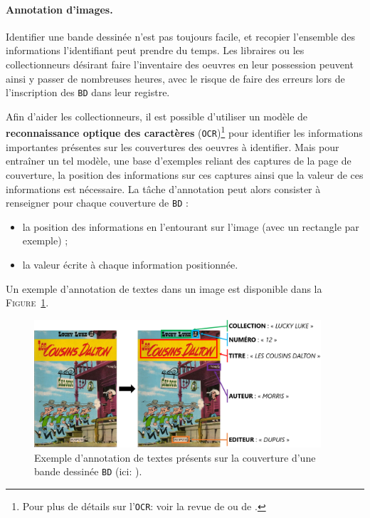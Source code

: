 			\paragraph{Annotation d'images.}
				
				Identifier une bande dessinée n'est pas toujours facile, et recopier l'ensemble des informations l'identifiant peut prendre du temps.
				Les libraires ou les collectionneurs désirant faire l'inventaire des oeuvres en leur possession peuvent ainsi y passer de nombreuses heures, avec le risque de faire des erreurs lors de l'inscription des \texttt{BD} dans leur registre.
				
				Afin d'aider les collectionneurs, il est possible d'utiliser un modèle de \textbf{reconnaissance optique des caractères} (\texttt{OCR})\footnote{Pour plus de détails sur l'\texttt{OCR}: voir la revue de \cite{berchmans-kumar:2014:optical-character-recognition} ou de \cite{awel-abidi:2019:review-optical-character}.} pour identifier les informations importantes présentes sur les couvertures des oeuvres à identifier.
				Mais pour entraîner un tel modèle, une base d'exemples reliant des captures de la page de couverture, la position des informations sur ces captures ainsi que la valeur de ces informations est nécessaire.
				La tâche d'annotation peut alors consister à renseigner pour chaque couverture de \texttt{BD} :
				\begin{itemize}
					\item la position des informations en l'entourant sur l'image (avec un rectangle par exemple) ;
					\item la valeur écrite à chaque information positionnée.
				\end{itemize}
				
				Un exemple d'annotation de textes dans un image est disponible dans la \textsc{Figure~\ref{figure:2.1.2-PRESENTATION-ANNOTATION-EXEMPLES-IMAGE-OCR}}.
				\begin{leftBarExamples}
					\begin{figure}[H]
						\centering
						\includegraphics[width=0.95\textwidth]{figures/etatdelart-morris-1958-lucky-luke-12}
						\caption{
							Exemple d'annotation de textes présents sur la couverture d'une bande dessinée \texttt{BD} (ici: \cite{morris-goscinny:1958:cousins-dalton}).
						}
						\label{figure:2.1.2-PRESENTATION-ANNOTATION-EXEMPLES-IMAGE-OCR}
					\end{figure}
				\end{leftBarExamples}
				
